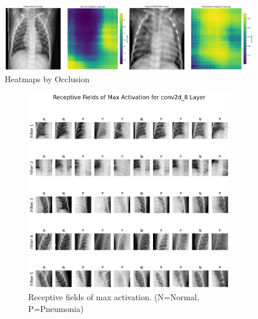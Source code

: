 \documentclass{article}
\begin{document}
\begin{figure}
  \centering
  \includegraphics[width=0.95\linewidth, angle=0]{occlusion.png}
  \caption{Heatmaps by Occlusion}
  \label{fig:occlusion}
\end{figure}

\begin{figure}
     \centering
     \begin{subfigure}[b]{0.45\textwidth}
         \centering
         \includegraphics[width=1.0\linewidth, angle=0]{receptive_fields.png}
          \caption{Receptive fields of max activation. (N=Normal, P=Pneumonia)}
          \label{fig:receptive_fields}
     \end{subfigure}
     \hfill
     \begin{subfigure}[b]{0.45\textwidth}
         \centering

\end{subfigure}
\end{figure}
\end{document}
